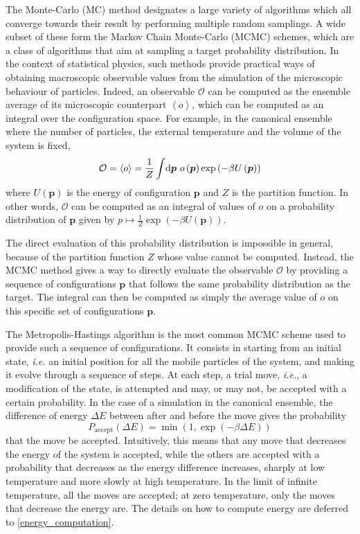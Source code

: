 \documentclass[main.tex]{subfiles}
\begin{document}
The Monte-Carlo (MC) method designates a large variety of algorithms which all converge towards their result by performing multiple random samplings. A wide subset of these form the Markov Chain Monte-Carlo (MCMC) schemes, which are a class of algorithms that aim at sampling a target probability distribution. In the context of statistical physics, such methods provide practical ways of obtaining macroscopic observable values from the simulation of the microscopic behaviour of particles. Indeed, an observable $\mathcal O$ can be computed as the ensemble average of its microscopic counterpart $\left<o\right>$, which can be computed as an integral over the configuration space. For example, in the canonical ensemble where the number of particles, the external temperature and the volume of the system is fixed, \[\mathcal O = \left<o\right> = \frac1Z\int\!\text d{\boldsymbol p}\  o\left({\boldsymbol p}\right)\exp\left(-\beta U\left({\boldsymbol p}\right)\right)\label{eq:canonicalensemble}\] where $ U\left({\boldsymbol p}\right)$ is the energy of configuration $\boldsymbol p$ and $Z$ is the partition function. In other words, $\mathcal O$ can be computed as an integral of values of $o$ on a probability distribution of $\boldsymbol p$ given by $p\mapsto \frac1Z\exp\left(-\beta U\left({\boldsymbol p}\right)\right)$.

The direct evaluation of this probability distribution is impossible in general, because of the partition function $Z$ whose value cannot be computed. Instead, the MCMC method gives a way to directly evaluate the observable $\mathcal O$ by providing a sequence of configurations $\boldsymbol p$ that follows the same probability distribution as the target. The integral can then be computed as simply the average value of $o$ on this specific set of configurations $\boldsymbol p$.

\label{metropolis}

The Metropolis-Hastings algorithm is the most common MCMC scheme used to provide such a sequence of configurations. It consists in starting from an initial state, \textit{i.e.} an initial position for all the mobile particles of the system, and making it evolve through a sequence of steps. At each step, a trial move, \textit{i.e.}, a modification of the state, is attempted and may, or may not, be accepted with a certain probability. In the case of a simulation in the canonical ensemble, the difference of energy $\Delta E$ between after and before the move gives the probability
\[P_\text{accept}(\Delta E) = \min\left(1, \exp\left(-\beta \Delta E\right)\right)\label{eq:MCcanonicalaccept}\]
that the move be accepted. Intuitively, this means that any move that decreases the energy of the system is accepted, while the others are accepted with a probability that decreases as the energy difference increases, sharply at low temperature and more slowly at high temperature. In the limit of infinite temperature, all the moves are accepted; at zero temperature, only the moves that decrease the energy are. The details on how to compute energy are deferred to \cref{energy_computation}.
\end{document}
